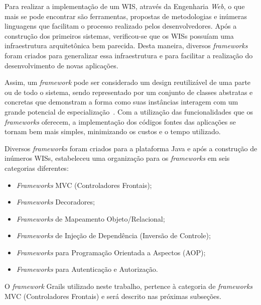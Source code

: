Para realizar a implementação de um WIS, através da Engenharia \textit{Web}, o que mais se pode encontrar são ferramentas, propostas de metodologias e inúmeras linguagens que facilitam o processo realizado pelos desenvolvedores. Após a construção dos primeiros sistemas, verificou-se que os WISs possuíam uma infraestrutura arquitetônica bem parecida. Desta maneira, diversos \textit{frameworks} foram criados para generalizar essa infraestrutura e para facilitar a realização do desenvolvimento de novas aplicações.

Assim, um \textit{framework} pode ser considerado um design reutilizável de uma parte ou de todo o sistema, sendo representado por um conjunto de classes abstratas e concretas que demonstram a forma como suas instâncias interagem com um grande potencial de especialização~\cite{mattsson-et-al:csef99}. Com a utilização das funcionalidades que os \textit{frameworks} oferecem, a implementação dos códigos fontes das aplicações se tornam bem mais simples, minimizando os custos e o tempo utilizado.

Diversos \textit{frameworks} foram criados para a plataforma Java e após a construção de inúmeros WISs,  estabeleceu uma organização para os \textit{frameworks} em seis categorias diferentes:    

\begin{itemize} 
	
	\item \textit{Frameworks} MVC (Controladores Frontais);
	
	\item \textit{Frameworks} Decoradores;
	
	\item \textit{Frameworks} de Mapeamento Objeto/Relacional;
	
	\item \textit{Frameworks} de Injeção de Dependência (Inversão de Controle);
	
	\item \textit{Frameworks} para Programação Orientada a Aspectos (AOP);
	
	\item \textit{Frameworks} para Autenticação e Autorização.
   
\end{itemize}

O \textit{framework} Grails utilizado neste trabalho, pertence à categoria de \textit{frameworks} MVC (Controladores Frontais) e será descrito nas próximas subseções.

